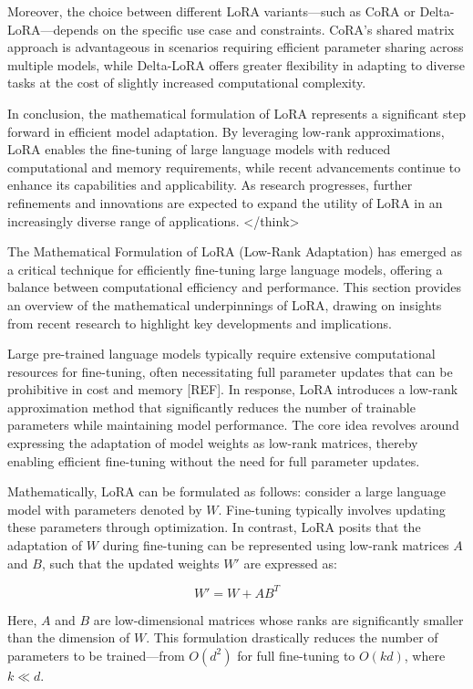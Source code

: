 \documentclass[conference]{IEEEtran}
\begin{document}
Moreover, the choice between different LoRA variants—such as CoRA or Delta-LoRA—depends on the specific use case and constraints. CoRA's shared matrix approach is advantageous in scenarios requiring efficient parameter sharing across multiple models, while Delta-LoRA offers greater flexibility in adapting to diverse tasks at the cost of slightly increased computational complexity.

In conclusion, the mathematical formulation of LoRA represents a significant step forward in efficient model adaptation. By leveraging low-rank approximations, LoRA enables the fine-tuning of large language models with reduced computational and memory requirements, while recent advancements continue to enhance its capabilities and applicability. As research progresses, further refinements and innovations are expected to expand the utility of LoRA in an increasingly diverse range of applications.
</think>

The Mathematical Formulation of LoRA (Low-Rank Adaptation) has emerged as a critical technique for efficiently fine-tuning large language models, offering a balance between computational efficiency and performance. This section provides an overview of the mathematical underpinnings of LoRA, drawing on insights from recent research to highlight key developments and implications.

Large pre-trained language models typically require extensive computational resources for fine-tuning, often necessitating full parameter updates that can be prohibitive in cost and memory [REF]. In response, LoRA introduces a low-rank approximation method that significantly reduces the number of trainable parameters while maintaining model performance. The core idea revolves around expressing the adaptation of model weights as low-rank matrices, thereby enabling efficient fine-tuning without the need for full parameter updates.

Mathematically, LoRA can be formulated as follows: consider a large language model with parameters denoted by \( W \). Fine-tuning typically involves updating these parameters through optimization. In contrast, LoRA posits that the adaptation of \( W \) during fine-tuning can be represented using low-rank matrices \( A \) and \( B \), such that the updated weights \( W' \) are expressed as:

\[
W' = W + AB^T
\]

Here, \( A \) and \( B \) are low-dimensional matrices whose ranks are significantly smaller than the dimension of \( W \). This formulation drastically reduces the number of parameters to be trained—from \( O(d^2) \) for full fine-tuning to \( O(kd) \), where \( k \ll d \).
\end{document}
